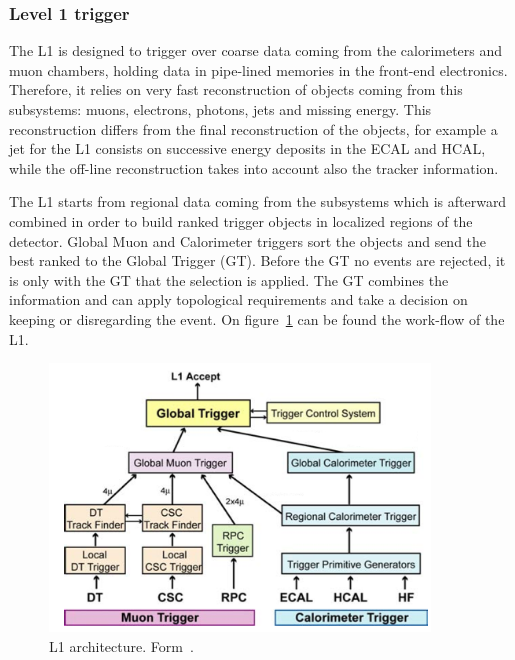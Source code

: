 \subsubsection{Level 1 trigger}
\label{sec:L1}

The L1 is designed to trigger over coarse data coming from the calorimeters and muon chambers, holding data in pipe-lined memories in the front-end electronics. Therefore, it relies on very fast reconstruction of objects coming from this subsystems: muons, electrons, photons, jets and missing energy. This reconstruction differs from the final reconstruction of the objects, for example a jet for the L1 consists on successive energy deposits in the ECAL and HCAL, while the off-line reconstruction takes into account also the tracker information. 

The L1 starts from regional data coming from the subsystems which is afterward combined in order to build ranked trigger objects in localized regions of the detector. Global Muon and Calorimeter triggers sort the objects and send the best ranked to the Global Trigger (GT). Before the GT no events are rejected, it is only with the GT that the selection is applied. The GT combines the information and can apply topological requirements and take a decision on keeping or disregarding the event. On figure~\ref{fig:l1} can be found the work-flow of the L1. 

\begin{figure}[!Hhtbp]
  \begin{center}
    \includegraphics[width=0.9\textwidth]{figs/img_l1.png}
    \caption{L1 architecture. Form~\cite{Lenzi:2013xpa}.}
    \label{fig:l1}
  \end{center}
\end{figure}

